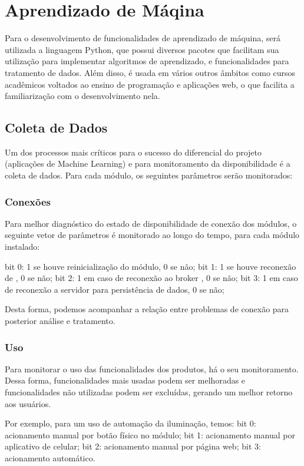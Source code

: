 \chapter{Aprendizado de Máqina}

Para o desenvolvimento de funcionalidades de aprendizado de máquina, será utilizada a linguagem Python, que possui diversos pacotes que facilitam sua utilização para implementar algoritmos de aprendizado, e funcionalidades para tratamento de dados. Além disso, é usada em vários outros âmbitos como cursos acadêmicos voltados ao ensino de programação e aplicações web, o que facilita a familiarização com o desenvolvimento nela.

\section{Coleta de Dados}
Um dos processos mais críticos para o sucesso do diferencial do projeto (aplicações de Machine Learning) e para monitoramento da disponibilidade é a coleta de dados. Para cada módulo, os seguintes parâmetros serão monitorados:

\subsection{Conexões}
Para melhor diagnóstico do estado de disponibilidade de conexão dos módulos, o seguinte vetor de parâmetros é monitorado ao longo do tempo, para cada módulo instalado:

bit 0: 1 se houve reinicialização do módulo, 0 se não;
bit 1: 1 se houve reconexão de \wwifi, 0 se não;
bit 2: 1 em caso de reconexão ao broker \wmqtt{}, 0 se não;
bit 3: 1 em caso de reconexão a servidor para persistência de dados, 0 se não;

Desta forma, podemos acompanhar a relação entre problemas de conexão para posterior análise e tratamento.

\subsection{Uso}
Para monitorar o uso das funcionalidades dos produtos, há o seu monitoramento. Dessa forma, funcionalidades mais usadas podem ser melhoradas e funcionalidades não utilizadas podem ser excluídas, gerando um melhor retorno aos usuários.

	Por exemplo, para um uso de automação da iluminação, temos:
bit 0: acionamento manual por botão físico no módulo;
bit 1: acionamento manual por aplicativo de celular;
bit 2: acionamento manual por página web;
bit 3: acionamento automático.
